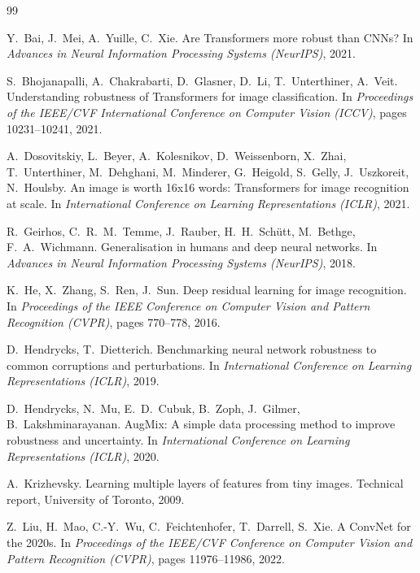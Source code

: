 \documentclass[a4paper,11pt]{article}
\begin{document}
\begin{thebibliography}{99}
\small

Y.~Bai, J.~Mei, A.~Yuille, C.~Xie.
\newblock Are Transformers more robust than CNNs?
\newblock In {\em Advances in Neural Information Processing Systems (NeurIPS)}, 2021.

S.~Bhojanapalli, A.~Chakrabarti, D.~Glasner, D.~Li, T.~Unterthiner, A.~Veit.
\newblock Understanding robustness of Transformers for image classification.
\newblock In {\em Proceedings of the IEEE/CVF International Conference on Computer Vision (ICCV)}, pages 10231--10241, 2021.

A.~Dosovitskiy, L.~Beyer, A.~Kolesnikov, D.~Weissenborn, X.~Zhai, T.~Unterthiner, M.~Dehghani, M.~Minderer, G.~Heigold, S.~Gelly, J.~Uszkoreit, N.~Houlsby.
\newblock An image is worth 16x16 words: Transformers for image recognition at scale.
\newblock In {\em International Conference on Learning Representations (ICLR)}, 2021.

R.~Geirhos, C.~R.~M.~Temme, J.~Rauber, H.~H.~Sch\"utt, M.~Bethge, F.~A.~Wichmann.
\newblock Generalisation in humans and deep neural networks.
\newblock In {\em Advances in Neural Information Processing Systems (NeurIPS)}, 2018.

K.~He, X.~Zhang, S.~Ren, J.~Sun.
\newblock Deep residual learning for image recognition.
\newblock In {\em Proceedings of the IEEE Conference on Computer Vision and Pattern Recognition (CVPR)}, pages 770--778, 2016.

D.~Hendrycks, T.~Dietterich.
\newblock Benchmarking neural network robustness to common corruptions and perturbations.
\newblock In {\em International Conference on Learning Representations (ICLR)}, 2019.

D.~Hendrycks, N.~Mu, E.~D.~Cubuk, B.~Zoph, J.~Gilmer, B.~Lakshminarayanan.
\newblock AugMix: A simple data processing method to improve robustness and uncertainty.
\newblock In {\em International Conference on Learning Representations (ICLR)}, 2020.

A.~Krizhevsky.
\newblock Learning multiple layers of features from tiny images.
\newblock Technical report, University of Toronto, 2009.

Z.~Liu, H.~Mao, C.-Y.~Wu, C.~Feichtenhofer, T.~Darrell, S.~Xie.
\newblock A ConvNet for the 2020s.
\newblock In {\em Proceedings of the IEEE/CVF Conference on Computer Vision and Pattern Recognition (CVPR)}, pages 11976--11986, 2022.


\end{thebibliography}
\end{document}

